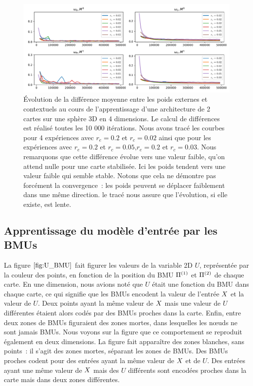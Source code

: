 \documentclass[../main]{subfiles}
\begin{document}
\begin{figure}
	\includegraphics[width=\textwidth]{evol_convergence_poids.pdf}
	\caption{\'Evolution de la différence moyenne entre les poids externes et contextuels au cours de l'apprentissage d'une architecture de 2 cartes sur une sphère 3D en 4 dimensions. Le calcul de différences est réalisé toutes les 10 000 itérations. Nous avons tracé les courbes pour 4 expériences avec $r_e = 0.2$ et $r_c = 0.02$ ainsi que pour les expériences avec $r_e = 0.2$ et $r_c = 0.05$,$r_e = 0.2$ et $r_c = 0.03$. Nous remarquons que cette différence évolue vers une valeur faible, qu'on attend nulle pour une carte stabilisée. Ici les poids tendent vers une valeur faible qui semble stable. Notons que cela ne démontre pas forcément la convergence~: les poids peuvent se déplacer faiblement dans une même direction. le tracé nous assure que l'évolution, si elle existe, est lente.}
\end{figure}

\subsection{Apprentissage du modèle d'entrée par les BMUs}

La figure $\ref{fig:U_BMU}$ fait figurer les valeurs de la variable 2D $U$, représentée par la couleur des points, en fonction de la position du BMU $\Pi^{({1})}$ et $\Pi^{({2})}$ de chaque carte. En une dimension, nous avions noté que $U$ était une fonction du BMU dans chaque carte, ce qui signifie que les BMUs encodent la valeur de l'entrée $X$ et la valeur de $U$. Deux points ayant la même valeur de $X$ mais une valeur de $U$ différentes étaient alors codés par des BMUs proches dans la carte.
Enfin, entre deux zones de BMUs figuraient des zones mortes, dans lesquelles les n\oe{}uds ne sont jamais BMUs.
Nous voyons sur la figure que ce comportement se reproduit également en deux dimensions. La figure fait apparaître des zones blanches, sans points~: il s'agit des zones mortes, séparant les zones de BMUs. Des BMUs proches codent pour des entrées ayant la même valeur de $X$ et de $U$. Des entrées ayant une même valeur de $X$ mais des $U$ différents sont encodées proches dans la carte mais dans deux zones différentes. 
\end{document}
